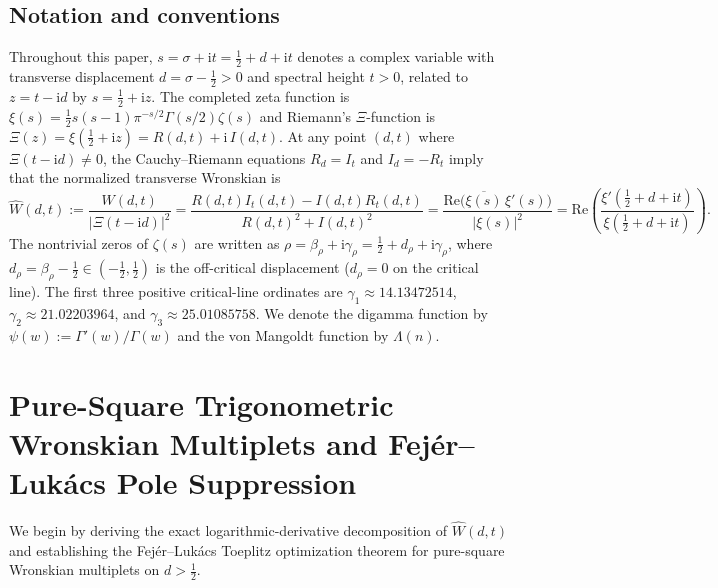 \documentclass[11pt,reqno]{amsart}
\theoremstyle{definition}
\theoremstyle{remark}
\numberwithin{equation}{section}
\newcommand{\ii}{\mathrm{i}}
\newcommand{\Rea}{\mathrm{Re}}
\begin{document}
\subsection{Notation and conventions}\label{subsec:notation}

Throughout this paper, $s = \sigma + \ii t = \frac{1}{2} + d + \ii t$ denotes a complex variable with transverse displacement $d = \sigma - \frac{1}{2} > 0$ and spectral height $t > 0$, related to $z = t - \ii d$ by $s = \frac{1}{2} + \ii z$. The completed zeta function is $\xi(s) = \frac{1}{2}s(s-1)\pi^{-s/2}\Gamma(s/2)\zeta(s)$ and Riemann's $\Xi$-function is $\Xi(z) = \xi(\frac{1}{2} + \ii z) = R(d,t) + \ii\,I(d,t)$. At any point $(d,t)$ where $\Xi(t - \ii d) \neq 0$, the Cauchy--Riemann equations $R_d = I_t$ and $I_d = -R_t$ imply that the normalized transverse Wronskian is
\begin{equation}\label{eq:W_hat_def}
\widehat{W}(d,t) := \frac{W(d,t)}{|\Xi(t - \ii d)|^2} = \frac{R(d,t)I_t(d,t) - I(d,t)R_t(d,t)}{R(d,t)^2 + I(d,t)^2} = \frac{\Rea\bigl(\overline{\xi(s)}\,\xi'(s)\bigr)}{|\xi(s)|^2} = \Rea\!\left(\frac{\xi'(\frac{1}{2}+d+\ii t)}{\xi(\frac{1}{2}+d+\ii t)}\right).
\end{equation}
The nontrivial zeros of $\zeta(s)$ are written as $\rho = \beta_\rho + \ii\gamma_\rho = \frac{1}{2} + d_\rho + \ii\gamma_\rho$, where $d_\rho = \beta_\rho - \frac{1}{2} \in (-\frac{1}{2}, \frac{1}{2})$ is the off-critical displacement ($d_\rho = 0$ on the critical line). The first three positive critical-line ordinates are $\gamma_1 \approx 14.13472514$, $\gamma_2 \approx 21.02203964$, and $\gamma_3 \approx 25.01085758$. We denote the digamma function by $\psi(w) := \Gamma'(w)/\Gamma(w)$ and the von Mangoldt function by $\Lambda(n)$.

\section{Pure-Square Trigonometric Wronskian Multiplets and Fej\'er--Luk\'acs Pole Suppression}\label{sec:pure_square}

We begin by deriving the exact logarithmic-derivative decomposition of $\widehat{W}(d,t)$ and establishing the Fej\'er--Luk\'acs Toeplitz optimization theorem for pure-square Wronskian multiplets on $d > \frac{1}{2}$.
\end{document}
